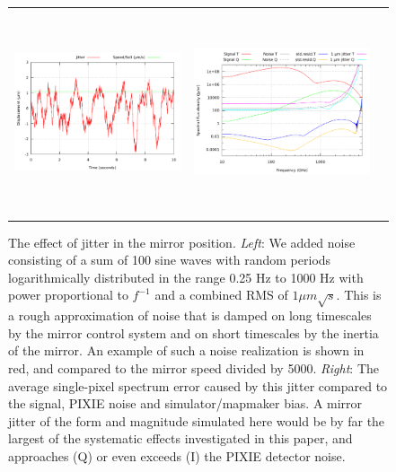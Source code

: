 \documentclass{article}
\begin{document}
\begin{figure}
	\centering
	\hspace*{-5mm}\begin{tabular}{ccc}
		\includegraphics[height=57mm,clip,trim=0 0 5mm 0]{plots/jit_wave_noise_realization.pdf} &
		\includegraphics[height=60mm,clip,trim=0 0 6mm 0]{plots/jitter_abs_log_log.pdf}
	\end{tabular}
	\caption{The effect of jitter in the mirror position. \emph{Left}:
	We added noise consisting of a sum of 100 sine waves with random
	periods logarithmically distributed in the range 0.25 Hz to 1000 Hz
	with power proportional to $f^{-1}$ and a combined RMS of $1\mu
	m\sqrt{s}$. This is a rough approximation of noise that is damped
	on long timescales by the mirror control system and on short timescales
	by the inertia of the mirror. An example of such a noise realization
	is shown in red,
	and compared to the mirror speed divided by 5000. \emph{Right}:
	The average single-pixel spectrum error caused by this jitter
	compared to the signal, PIXIE noise and simulator/mapmaker bias.
	A mirror jitter of the form and magnitude simulated here would be
	by far the largest of the systematic effects investigated in this
	paper, and approaches (Q) or even exceeds (I) the PIXIE detector
	noise.}
\end{figure}
\end{document}
